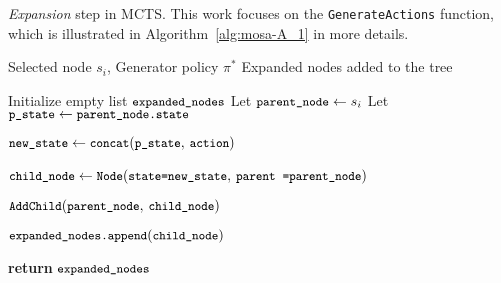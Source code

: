 \begin{algorithm}[tb]
\caption{\emph{Expansion} step in MCTS. This work focuses on the \texttt{GenerateActions} function, which is illustrated in Algorithm~\ref{alg:mosa-A_1} in more details.}
\label{alg:expand}
\begin{algorithmic}
\REQUIRE Selected node $s_i$, Generator policy $\pi^*$
\ENSURE Expanded nodes added to the tree

\STATE Initialize empty list $\texttt{\small expanded\_nodes}$
\STATE Let \hspace{1pt} $\texttt{\small parent\_node} \leftarrow s_i$
\STATE Let \hspace{1pt} $\texttt{\small p\_state} \leftarrow \texttt{\small parent\_node.state}$

\STATE {}
    \STATE {}
    \STATE $\texttt{\small new\_state} \leftarrow \texttt{\small concat}(\texttt{\small p\_state},\hspace{2pt} \texttt{\small action})$

    \STATE {}
    \STATE $\texttt{\small child\_node} \leftarrow \texttt{\small Node}(\texttt{\small state=new\_state},\hspace{2pt} \texttt{\small parent}$
    \STATE $\texttt{\small =parent\_node})$
    
    \STATE {}
    \STATE $\texttt{\small AddChild}(\texttt{\small parent\_node},\hspace{2pt} \texttt{\small child\_node})$
    
    \STATE {}
    \STATE $\texttt{\small expanded\_nodes.append}(\texttt{\small child\_node})$
\ENDFOR

\STATE \textbf{return} $\texttt{\small expanded\_nodes}$
\end{algorithmic}
\end{algorithm}